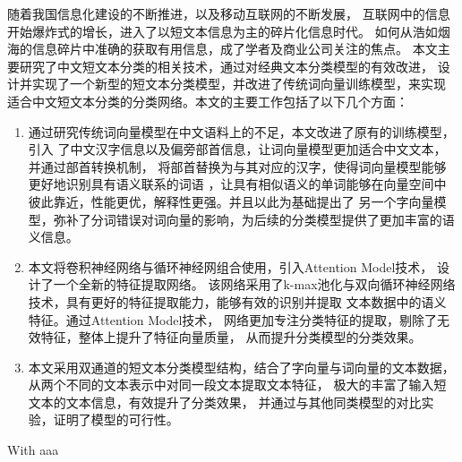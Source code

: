\begin{chineseabstract}
随着我国信息化建设的不断推进，以及移动互联网的不断发展，
互联网中的信息开始爆炸式的增长，进入了以短文本信息为主的碎片化信息时代。
如何从浩如烟海的信息碎片中准确的获取有用信息，成了学者及商业公司关注的焦点。
本文主要研究了中文短文本分类的相关技术，通过对经典文本分类模型的有效改进，
设计并实现了一个新型的短文本分类模型，并改进了传统词向量训练模型，来实现
适合中文短文本分类的分类网络。本文的主要工作包括了以下几个方面：
\begin{enumerate}
    \item 通过研究传统词向量模型在中文语料上的不足，本文改进了原有的训练模型，引入
    了中文汉字信息以及偏旁部首信息，让词向量模型更加适合中文文本，并通过部首转换机制，
    将部首替换为与其对应的汉字，使得词向量模型能够更好地识别具有语义联系的词语
    ，让具有相似语义的单词能够在向量空间中彼此靠近，性能更优，解释性更强。并且以此为基础提出了
    另一个字向量模型，弥补了分词错误对词向量的影响，为后续的分类模型提供了更加丰富的语义信息。
    \item 本文将卷积神经网络与循环神经网组合使用，引入Attention Model技术，
    设计了一个全新的特征提取网络。
    该网络采用了k-max池化与双向循环神经网络技术，具有更好的特征提取能力，能够有效的识别并提取
    文本数据中的语义特征。通过Attention Model技术，
    网络更加专注分类特征的提取，剔除了无效特征，整体上提升了特征向量质量，
    从而提升分类模型的分类效果。
    
    \item 本文采用双通道的短文本分类模型结构，结合了字向量与词向量的文本数据，
    从两个不同的文本表示中对同一段文本提取文本特征，
    极大的丰富了输入短文本的文本信息，有效提升了分类效果，
    并通过与其他同类模型的对比实验，证明了模型的可行性。
\end{enumerate}


\end{chineseabstract}



\begin{englishabstract}
With aaa

\end{englishabstract}
    